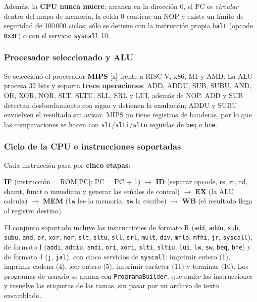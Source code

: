 \documentclass[11pt,letterpaper,oneside]{article}
\begin{document}
Además, la \textbf{CPU nunca muere}: arranca en la dirección 0, el PC es
\emph{circular} dentro del mapa de memoria, la celda 0 contiene un NOP y existe
un límite de seguridad de 100\,000 ciclos; sólo se detiene con la instrucción
propia \texttt{halt} (opcode \texttt{0x3F}) o con el servicio \texttt{syscall}
10.

\subsubsection{Procesador seleccionado y ALU}

Se seleccionó el procesador \textbf{MIPS} [x] frente a RISC-V, x86, M1 y AMD.
La ALU procesa 32 bits y soporta \textbf{trece operaciones}: ADD, ADDU, SUB,
SUBU, AND, OR, XOR, NOR, SLT, SLTU, SLL, SRL y LUI, además de NOP. ADD y SUB
detectan desbordamiento con signo y detienen la emulación; ADDU y SUBU envuelven
el resultado sin avisar. MIPS no tiene registros de banderas, por lo que las
comparaciones se hacen con \texttt{slt}/\texttt{slti}/\texttt{sltu} seguidas de
\texttt{beq} o \texttt{bne}.

\subsubsection{Ciclo de la CPU e instrucciones soportadas}

Cada instrucción pasa por \textbf{cinco etapas}:

\begin{requisito}
\textbf{IF} (instrucción = ROM[PC]; PC = PC + 1) $\rightarrow$
\textbf{ID} (separar opcode, rs, rt, rd, shamt, funct o inmediato y generar las
señales de control) $\rightarrow$ \textbf{EX} (la ALU calcula) $\rightarrow$
\textbf{MEM} (\texttt{lw} lee la memoria, \texttt{sw} la escribe) $\rightarrow$
\textbf{WB} (el resultado llega al registro destino).
\end{requisito}

El conjunto soportado incluye las instrucciones de formato R (\texttt{add},
\texttt{addu}, \texttt{sub}, \texttt{subu}, \texttt{and}, \texttt{or},
\texttt{xor}, \texttt{nor}, \texttt{slt}, \texttt{sltu}, \texttt{sll},
\texttt{srl}, \texttt{mult}, \texttt{div}, \texttt{mflo}, \texttt{mfhi},
\texttt{jr}, \texttt{syscall}), de formato I (\texttt{addi}, \texttt{addiu},
\texttt{andi}, \texttt{ori}, \texttt{xori}, \texttt{slti}, \texttt{sltiu},
\texttt{lui}, \texttt{lw}, \texttt{sw}, \texttt{beq}, \texttt{bne}) y de formato
J (\texttt{j}, \texttt{jal}), con cinco servicios de \texttt{syscall}: imprimir
entero (1), imprimir cadena (4), leer entero (5), imprimir carácter (11) y
terminar (10). Los programas de usuario se arman con \texttt{ProgramaBuilder},
que emite las instrucciones y resuelve las etiquetas de las ramas, sin pasar
por un archivo de texto ensamblado.
\end{document}
